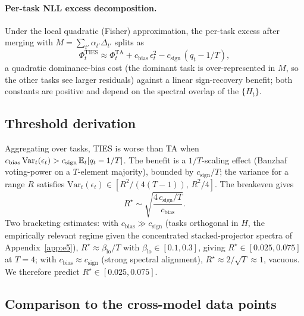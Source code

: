 \paragraph{Per-task NLL excess decomposition.} Under the local
quadratic (Fisher) approximation, the per-task excess after merging
with $M = \sum_{t'} \alpha_{t'}\Delta_{t'}$ splits as
\begin{equation}
  \Phi_t^{\mathrm{TIES}}
  \approx
  \Phi_t^{\mathrm{TA}}
  + c_{\mathrm{bias}}\,\epsilon_t^2
  - c_{\mathrm{sign}}\,(q_t - 1/T),
  \label{eq:excess-decomp}
\end{equation}
a quadratic dominance-bias cost (the dominant task is over-represented
in $M$, so the other tasks see larger residuals) against a linear
sign-recovery benefit; both constants are positive and depend on the
spectral overlap of the $\{H_t\}$.

\subsection{Threshold derivation}

Aggregating over tasks, TIES is worse than TA when
$c_{\mathrm{bias}}\,\mathrm{Var}_t(\epsilon_t) >
c_{\mathrm{sign}}\,\mathbb{E}_t[q_t - 1/T]$. The benefit is a $1/T$-scaling
effect (Banzhaf voting-power on a $T$-element majority), bounded by
$c_{\mathrm{sign}}/T$; the variance for a range $R$ satisfies
$\mathrm{Var}_t(\epsilon_t) \in [R^2/(4(T-1)),\, R^2/4]$. The
breakeven gives
\begin{equation}
  R^\star
  \sim
  \sqrt{\frac{4\, c_{\mathrm{sign}}/T}{c_{\mathrm{bias}}}}.
  \label{eq:threshold}
\end{equation}
Two bracketing estimates: with $c_{\mathrm{bias}} \gg
c_{\mathrm{sign}}$ (tasks orthogonal in $H$, the empirically relevant
regime given the concentrated stacked-projector spectra of
Appendix~\ref{app:e5}), $R^\star \approx \beta_{\mathrm{lo}}/T$ with
$\beta_{\mathrm{lo}} \in [0.1, 0.3]$, giving
$R^\star \in [0.025, 0.075]$ at $T = 4$; with $c_{\mathrm{bias}}
\approx c_{\mathrm{sign}}$ (strong spectral alignment),
$R^\star \approx 2/\sqrt{T} \approx 1$, vacuous. We therefore predict
$R^\star \in [0.025, 0.075]$.

\subsection{Comparison to the cross-model data points}
\label{app:td2-comparison}

